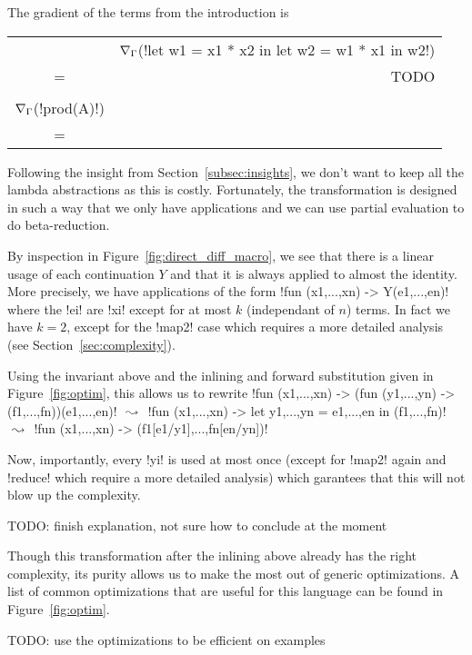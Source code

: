 \begin{example}
    The gradient of the terms from the introduction is

    \begin{tabular}{c r}
        & $\nabla_\Gamma$(!let w1 = x1 * x2 in let w2 = w1 * x1 in w2!) \\
        =& TODO \\
        \\
        $\nabla_\Gamma$(!prod(A)!) \\
        =& \\
    \end{tabular}
\end{example}

Following the insight from Section~\ref{subsec:insights}, 
we don't want to keep all the lambda abstractions as this is costly. 
Fortunately, the transformation is designed in such a way that we only have applications 
and we can use partial evaluation to do beta-reduction. 

By inspection in Figure~\ref{fig:direct_diff_macro}, 
we see that there is a linear usage of  each continuation $Y$ 
and that it is always applied to almost the identity. 
More precisely, we have applications of the form !fun (x1,...,xn) -> Y(e1,...,en)! 
where the !ei! are !xi! except for at most $k$ (independant of $n$) terms.
In fact we have $k=2$, except for the !map2! case which requires a more detailed analysis (see Section~\ref{sec:complexity}).

Using the invariant above and the inlining and forward substitution given in Figure~\ref{fig:optim}, this allows us to rewrite
!fun (x1,...,xn) -> (fun (y1,...,yn) -> (f1,...,fn))(e1,...,en)! 
$\text{ $\leadsto$ }$ 
!fun (x1,...,xn) -> let y1,...,yn = e1,...,en in (f1,...,fn)!
$\text{ $\leadsto$ }$
!fun (x1,...,xn) -> (f1[e1/y1],...,fn[en/yn])!

Now, importantly, every !yi! is used at most once (except for !map2! again and !reduce! which require a more detailed analysis)
which garantees that this will not blow up the complexity.

TODO: finish explanation, not sure how to conclude at the moment

Though this transformation after the inlining above already has the right complexity, 
its purity allows us to make the most out of generic optimizations.  
A list of common optimizations that are useful for this language can be found in Figure~\ref{fig:optim}.

TODO: use the optimizations to be efficient on examples